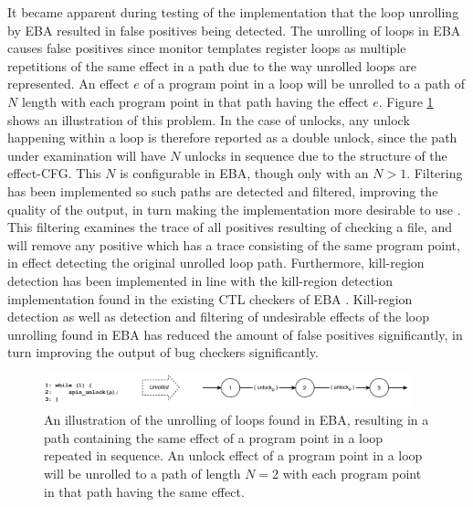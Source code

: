 \newpar It became apparent during testing of the implementation that the loop unrolling by EBA resulted in false positives being detected. The unrolling of loops in EBA causes false positives since monitor templates register loops as multiple repetitions of the same effect in a path due to the way unrolled loops are represented. An effect $e$ of a program point in a loop will be unrolled to a path of $N$ length with each program point in that path having the effect $e$. Figure \ref{unrolling-false-positive} shows an illustration of this problem. In the case of unlocks, any unlock happening within a loop is therefore reported as a double unlock, since the path under examination will have $N$ unlocks in sequence due to the structure of the effect-CFG. This $N$ is configurable in EBA, though only with an $N > 1$. Filtering has been implemented so such paths are detected and filtered, improving the quality of the output, in turn making the implementation more desirable to use \cite{false-positives}. This filtering examines the trace of all positives resulting of checking a file, and will remove any positive which has a trace consisting of the same program point, in effect detecting the original unrolled loop path. Furthermore, kill-region detection has been implemented in line with the kill-region detection implementation found in the existing CTL checkers of EBA \cite{Abal2017EffectiveBF}. Kill-region detection as well as detection and filtering of undesirable effects of the loop unrolling found in EBA has reduced the amount of false positives significantly, in turn improving the output of bug checkers significantly. 

\begin{figure}[H]
    \centering
    \includegraphics[width=0.95\textwidth]{implementation/figures/unrolling-false-positive}
    \caption{An illustration of the unrolling of loops found in EBA, resulting in a path containing the same effect of a program point in a loop repeated in sequence. An unlock effect of a program point in a loop will be unrolled to a path of length $N = 2$ with each program point in that path having the same effect.}
    \label{unrolling-false-positive}
\end{figure}
